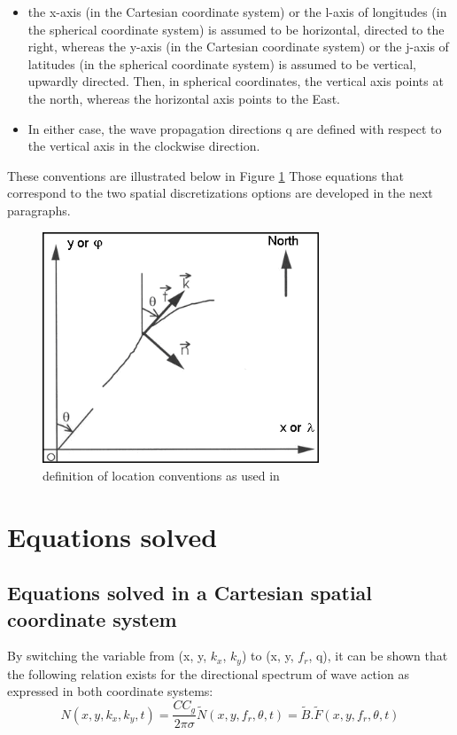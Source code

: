  \begin{itemize}
 \item the x-axis (in the Cartesian coordinate system) or the l-axis of
   longitudes (in the spherical coordinate system) is assumed to be horizontal,
   directed to the right, whereas the y-axis (in the Cartesian coordinate
   system) or the j-axis of latitudes (in the spherical coordinate system) is
   assumed to be vertical, upwardly directed. Then, in spherical coordinates,
   the vertical axis points at the north, whereas the horizontal axis points
   to the East.

 \item In either case, the wave propagation directions q are defined with
   respect to the vertical axis in the clockwise direction.
\end{itemize}

 These conventions are illustrated below in Figure \ref{fig:defloc} Those
 equations that correspond to the two spatial discretizations options are
 developed in the next paragraphs.

\begin{figure}[H]%
\begin{center}
\includegraphics*[width=3.25in,  keepaspectratio=true]{graphics/defloc}
\caption{definition of location conventions as used in \tomawac}
\label{fig:defloc}
\end{center}
\end{figure}

\section{Equations solved}
\subsection{Equations solved in a Cartesian spatial coordinate system}
By switching the variable from (x, y, $k_x$, $k_y$) to (x, y, $f_r$, q), it can
be shown that the following relation exists for the directional spectrum of wave
action as expressed in both coordinate systems:
\begin{equation} \label{GrindEQ__4_9_}
  N(x,y,k_x ,k_y ,t)=\frac{CC_g }{2\pi \sigma } \tilde{N}(x,y,f_r,\theta,t)
  =\tilde{B}.\tilde{F}(x,y,f_r,\theta,t)
\end{equation}

